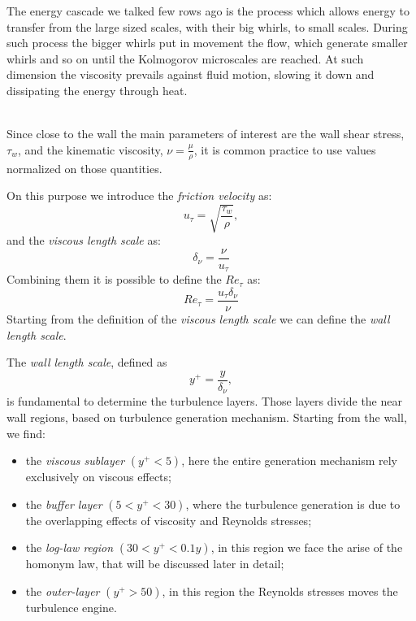 The energy cascade we talked few rows ago is the process which allows energy to transfer from the large sized scales, with their big whirls, to small scales. During such process the bigger whirls put in movement the flow, which generate smaller whirls and so on until the Kolmogorov microscales are reached. At such dimension the viscosity prevails against fluid motion, slowing it down and dissipating the energy through heat. \\~\par

Since close to the wall the main parameters of interest are the wall shear stress, $\tau_{w}$, and the kinematic viscosity, $\nu=\frac{\mu}{\rho}$, it is common practice to use values normalized on those quantities.\par
On this purpose we introduce the \emph{friction velocity} as:
\begin{equation*}
u_{\tau} = \sqrt{\frac{\tau_{w}}{\rho}},
\end{equation*}
and the \emph{viscous length scale} as:
\begin{equation*}
\delta_{\nu} = \frac{\nu}{u_{\tau}}
\end{equation*}
Combining them it is possible to define the $Re_{\tau}$ as:
\begin{equation*}
Re_{\tau} = \frac{u_{\tau}\delta_{\nu}}{\nu}
\end{equation*}
Starting from the definition of the \emph{viscous length scale} we can define the \emph{wall length scale}. \par
The \emph{wall length scale}, defined as
\begin{equation*}
y^{+} = \frac{y}{\delta_{\nu}},
\end{equation*}
is fundamental to determine the turbulence layers. Those layers divide the near wall regions, based on turbulence generation mechanism.
Starting from the wall, we find:
\begin{itemize}
\item the \emph{viscous sublayer} $(y^{+}<5)$, here the entire generation mechanism rely exclusively on viscous effects;
\item the \emph{buffer layer} $(5<y^{+}<30)$, where the turbulence generation is due to the overlapping effects of viscosity and Reynolds stresses;
\item the \emph{log-law region} $(30<y^{+}<0.1y)$, in this region we face the arise of the homonym law, that will be discussed later in detail;
\item the \emph{outer-layer} $(y^{+}>50)$, in this region the Reynolds stresses moves the turbulence engine.
\end{itemize}


  